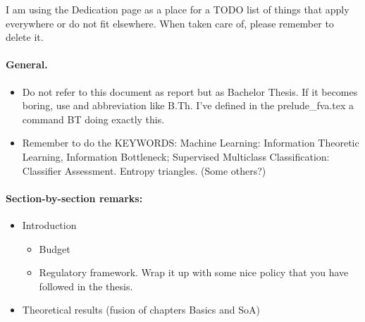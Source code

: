 {\color{red} %
I am using the Dedication page as a place for a TODO list of things that apply everywhere or do not fit elsewhere. When taken care of, please remember to delete it. 

\paragraph{General. }

\begin{itemize}

\item Do not refer to this document as report but as Bachelor Thesis. If it becomes boring, use and abbreviation like B.Th. I've defined in  the prelude\_fva.tex a command {}BT doing exactly this.

\item Remember to do the KEYWORDS: Machine Learning: Information Theoretic Learning, Information Bottleneck; Supervised Multiclass Classification: Classifier Assessment. Entropy triangles. (Some others?)

\end{itemize}

\paragraph{Section-by-section remarks: }
\begin{itemize}
\item Introduction

\begin{itemize}
\item Budget

\item  Regulatory framework. Wrap it up with some nice policy that you have followed in the thesis. 
\end{itemize} 

\item Theoretical results (fusion of chapters Basics and SoA)

\end{itemize}
} %
